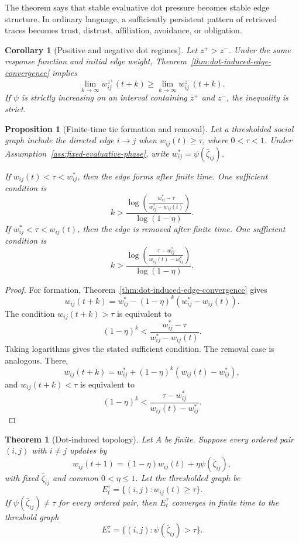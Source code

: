 \documentclass[11pt]{article}
\newtheorem{theorem}{Theorem}
\newtheorem{proposition}{Proposition}
\newtheorem{corollary}{Corollary}
\theoremstyle{remark}
\begin{document}
The theorem says that stable evaluative dot pressure becomes stable edge
structure. In ordinary language, a sufficiently persistent pattern of
retrieved traces becomes trust, distrust, affiliation, avoidance, or
obligation.

\begin{corollary}[Positive and negative dot regimes]\label{cor:positive-negative-dot-regimes}
Let $z^+>z^-$. Under the same response function and initial edge weight,
Theorem~\ref{thm:dot-induced-edge-convergence} implies
$$
\lim_{k\to\infty} w_{ij}^{z^+}(t+k)
\geq
\lim_{k\to\infty} w_{ij}^{z^-}(t+k).
$$
If $\psi$ is strictly increasing on an interval containing $z^+$ and
$z^-$, the inequality is strict.
\end{corollary}


\begin{proposition}[Finite-time tie formation and removal]\label{prop:finite-time-tie-formation-removal}
Let a thresholded social graph include the directed edge $i\to j$ when
$w_{ij}(t)\geq\tau$, where $0<\tau<1$. Under
Assumption~\ref{ass:fixed-evaluative-phase}, write
$w^*_{ij}=\psi(\bar{\zeta}_{ij})$.

If $w_{ij}(t)<\tau<w^*_{ij}$, then the edge forms after finite time. One
sufficient condition is
$$
k>
\frac{\log\left(\frac{w^*_{ij}-\tau}{w^*_{ij}-w_{ij}(t)}\right)}
{\log(1-\eta)}.
$$
If $w^*_{ij}<\tau<w_{ij}(t)$, then the edge is removed after finite
time. One sufficient condition is
$$
k>
\frac{\log\left(\frac{\tau-w^*_{ij}}{w_{ij}(t)-w^*_{ij}}\right)}
{\log(1-\eta)}.
$$
\end{proposition}

\begin{proof}
For formation, Theorem~\ref{thm:dot-induced-edge-convergence} gives
$$
w_{ij}(t+k)=w^*_{ij}-(1-\eta)^k(w^*_{ij}-w_{ij}(t)).
$$
The condition $w_{ij}(t+k)>\tau$ is equivalent to
$$
(1-\eta)^k<\frac{w^*_{ij}-\tau}{w^*_{ij}-w_{ij}(t)}.
$$
Taking logarithms gives the stated sufficient condition. The removal
case is analogous. There,
$$
w_{ij}(t+k)=w^*_{ij}+(1-\eta)^k(w_{ij}(t)-w^*_{ij}),
$$
and $w_{ij}(t+k)<\tau$ is equivalent to
$$
(1-\eta)^k<\frac{\tau-w^*_{ij}}{w_{ij}(t)-w^*_{ij}}.
$$
\end{proof}

\begin{theorem}[Dot-induced topology]\label{thm:dot-induced-topology}
Let $A$ be finite. Suppose every ordered pair $(i,j)$ with $i\neq j$
updates by
$$
w_{ij}(t+1)=(1-\eta)w_{ij}(t)+\eta\psi(\bar{\zeta}_{ij}),
$$
with fixed $\bar{\zeta}_{ij}$ and common $0<\eta\leq1$. Let the thresholded graph
be
$$
E_t^\tau=\{(i,j):w_{ij}(t)\geq\tau\}.
$$
If $\psi(\bar{\zeta}_{ij})\neq\tau$ for every ordered pair, then $E_t^\tau$
converges in finite time to the threshold graph
$$
E_*^\tau=\{(i,j):\psi(\bar{\zeta}_{ij})>\tau\}.
$$
\end{theorem}
\end{document}
